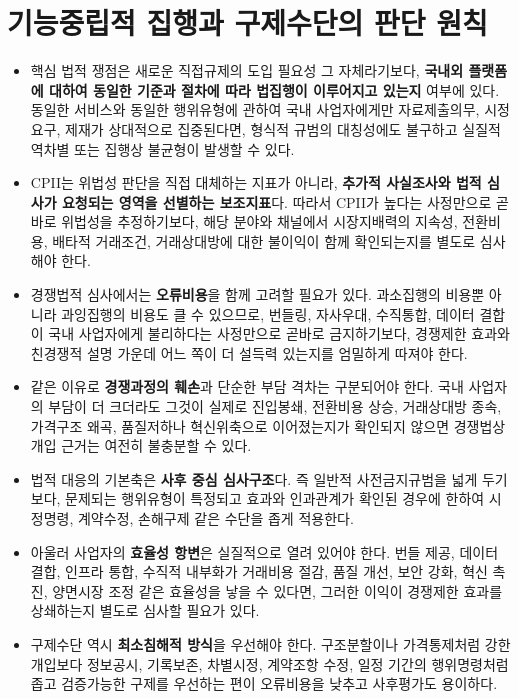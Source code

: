 \documentclass[11pt,a4paper]{report}
\begin{document}
\section{기능중립적 집행과 구제수단의 판단 원칙}
\begin{itemize}[leftmargin=1.8em,itemsep=0.35em]
  \item 핵심 법적 쟁점은 새로운 직접규제의 도입 필요성 그 자체라기보다, \textbf{국내외 플랫폼에 대하여 동일한 기준과 절차에 따라 법집행이 이루어지고 있는지} 여부에 있다. 동일한 서비스와 동일한 행위유형에 관하여 국내 사업자에게만 자료제출의무, 시정요구, 제재가 상대적으로 집중된다면, 형식적 규범의 대칭성에도 불구하고 실질적 역차별 또는 집행상 불균형이 발생할 수 있다.
  \item CPII는 위법성 판단을 직접 대체하는 지표가 아니라, \textbf{추가적 사실조사와 법적 심사가 요청되는 영역을 선별하는 보조지표}다. 따라서 CPII가 높다는 사정만으로 곧바로 위법성을 추정하기보다, 해당 분야와 채널에서 시장지배력의 지속성, 전환비용, 배타적 거래조건, 거래상대방에 대한 불이익이 함께 확인되는지를 별도로 심사해야 한다.
  \item 경쟁법적 심사에서는 \textbf{오류비용}을 함께 고려할 필요가 있다. 과소집행의 비용뿐 아니라 과잉집행의 비용도 클 수 있으므로, 번들링, 자사우대, 수직통합, 데이터 결합이 국내 사업자에게 불리하다는 사정만으로 곧바로 금지하기보다, 경쟁제한 효과와 친경쟁적 설명 가운데 어느 쪽이 더 설득력 있는지를 엄밀하게 따져야 한다.
  \item 같은 이유로 \textbf{경쟁과정의 훼손}과 단순한 부담 격차는 구분되어야 한다. 국내 사업자의 부담이 더 크더라도 그것이 실제로 진입봉쇄, 전환비용 상승, 거래상대방 종속, 가격구조 왜곡, 품질저하나 혁신위축으로 이어졌는지가 확인되지 않으면 경쟁법상 개입 근거는 여전히 불충분할 수 있다.
  \item 법적 대응의 기본축은 \textbf{사후 중심 심사구조}다. 즉 일반적 사전금지규범을 넓게 두기보다, 문제되는 행위유형이 특정되고 효과와 인과관계가 확인된 경우에 한하여 시정명령, 계약수정, 손해구제 같은 수단을 좁게 적용한다.
  \item 아울러 사업자의 \textbf{효율성 항변}은 실질적으로 열려 있어야 한다. 번들 제공, 데이터 결합, 인프라 통합, 수직적 내부화가 거래비용 절감, 품질 개선, 보안 강화, 혁신 촉진, 양면시장 조정 같은 효율성을 낳을 수 있다면, 그러한 이익이 경쟁제한 효과를 상쇄하는지 별도로 심사할 필요가 있다.
  \item 구제수단 역시 \textbf{최소침해적 방식}을 우선해야 한다. 구조분할이나 가격통제처럼 강한 개입보다 정보공시, 기록보존, 차별시정, 계약조항 수정, 일정 기간의 행위명령처럼 좁고 검증가능한 구제를 우선하는 편이 오류비용을 낮추고 사후평가도 용이하다.

\end{itemize}
\end{document}
